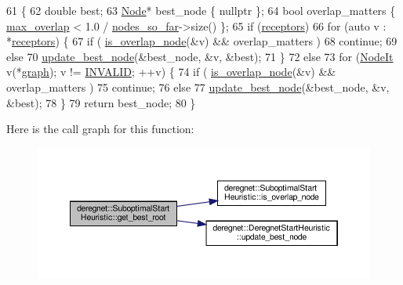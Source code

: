 \begin{DoxyCode}
61                                               \{
62     \textcolor{keywordtype}{double} best;
63     \hyperlink{namespacederegnet_a744bad34f2de9856d36715a445f027f3}{Node}* best\_node \{ \textcolor{keyword}{nullptr} \};
64     \textcolor{keywordtype}{bool} overlap\_matters \{ \hyperlink{classderegnet_1_1SuboptimalStartHeuristic_ab7da09c5dc0c3fd13e19d254319ab3ba}{max\_overlap} < 1.0 / \hyperlink{classderegnet_1_1SuboptimalStartHeuristic_af9a38b598d55b9a1fa22b9f0c141218b}{nodes\_so\_far}->size() \};
65     \textcolor{keywordflow}{if} (\hyperlink{classderegnet_1_1DeregnetStartHeuristic_ab80c046ff2b7c64086fceb84987b3e50}{receptors})
66         \textcolor{keywordflow}{for} (\textcolor{keyword}{auto} v : *\hyperlink{classderegnet_1_1DeregnetStartHeuristic_ab80c046ff2b7c64086fceb84987b3e50}{receptors}) \{
67             \textcolor{keywordflow}{if} ( \hyperlink{classderegnet_1_1SuboptimalStartHeuristic_a911e7e3003bbf92b170a943e714b014e}{is\_overlap\_node}(&v) && overlap\_matters )
68                 \textcolor{keywordflow}{continue};
69             \textcolor{keywordflow}{else}
70                 \hyperlink{classderegnet_1_1DeregnetStartHeuristic_a50179ff9db4d416b93ff41d1dcee1358}{update\_best\_node}(&best\_node, &v, &best);
71         \}
72     \textcolor{keywordflow}{else}
73         \textcolor{keywordflow}{for} (\hyperlink{namespacederegnet_ac34314e1b5f456fc6d1bb9d96316de4a}{NodeIt} v(*\hyperlink{classderegnet_1_1DeregnetStartHeuristic_a4da8e53fc7c0fa3dbe0e3ef07296d75e}{graph}); v != \hyperlink{usinglemon_8hpp_adf770fe2eec438e3758ffe905dbae208}{INVALID}; ++v) \{
74             \textcolor{keywordflow}{if} ( \hyperlink{classderegnet_1_1SuboptimalStartHeuristic_a911e7e3003bbf92b170a943e714b014e}{is\_overlap\_node}(&v) && overlap\_matters )
75                 \textcolor{keywordflow}{continue};
76             \textcolor{keywordflow}{else}
77                 \hyperlink{classderegnet_1_1DeregnetStartHeuristic_a50179ff9db4d416b93ff41d1dcee1358}{update\_best\_node}(&best\_node, &v, &best);
78         \}
79     \textcolor{keywordflow}{return} best\_node;
80 \}
\end{DoxyCode}
Here is the call graph for this function\+:\nopagebreak
\begin{figure}[H]
\begin{center}
\leavevmode
\includegraphics[width=350pt]{classderegnet_1_1SuboptimalStartHeuristic_aaa8bad0a658a0e1de5e849a5fb58aa21_cgraph}
\end{center}
\end{figure}

